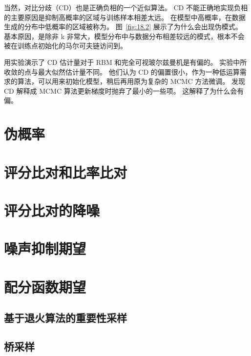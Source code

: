 当然，对比分歧（CD）也是正确负相的一个近似算法。
CD 不能正确地实现负相的主要原因是抑制高概率的区域与训练样本相差太远。
在模型中高概率，在数据生成的分布中低概率的区域被称为。
图~\ref{fig:18.2} 展示了为什么会出现伪模式。
基本原因，是除非 k 非常大，模型分布中与数据分布相差较远的模式，根本不会被在训练点初始化的马尔可夫链访问到。

 用实验演示了 CD 估计量对于 RBM 和完全可视玻尔兹曼机是有偏的。
实验中所收敛的点与最大似然估计量不同。
他们认为 CD 的偏置很小，作为一种低运算需求的算法，可以用来初始化模型，稍后再用原为复杂的 MCMC 方法微调。
 发现 CD 解释成 MCMC 算法更新梯度时抛弃了最小的一些项。
这解释了为什么会有偏。



\section{伪概率}
\label{sec:18.3}

\section{评分比对和比率比对}
\label{sec:18.4}

\section{评分比对的降噪}
\label{sec:18.5}

\section{噪声抑制期望}
\label{sec:18.6}

\section{配分函数期望}
\label{sec:18.7}

\subsection{基于退火算法的重要性采样}
\label{sec:18.7.1}

\subsection{桥采样}
\label{sec:18.7.2}
